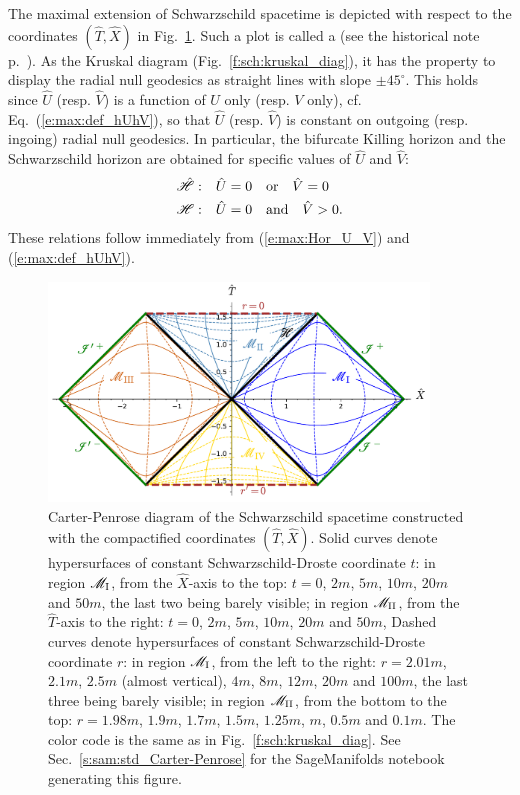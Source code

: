 The maximal extension of Schwarzschild spacetime is depicted with respect
to the coordinates $(\hat{T},\hat{X})$ in Fig.~\ref{f:max:carter-penrose-std}.
Such a plot is called a 
(see the historical note p.~\pageref{h:max:CP-diag}).
As the Kruskal diagram (Fig.~\ref{f:sch:kruskal_diag}), it has the property
to display the radial null geodesics as straight lines with slope $\pm 45^\circ$.
This holds
since $\hat{U}$ (resp. $\hat{V}$) is a function of $U$ only
(resp. $V$ only), cf. Eq.~(\ref{e:max:def_hUhV}), so that $\hat{U}$
(resp. $\hat{V}$) is constant on outgoing (resp. ingoing) radial null geodesics.
In particular, the bifurcate Killing horizon and the Schwarzschild horizon
are obtained for specific values of $\hat{U}$ and $\hat{V}$:
\begin{subequations}
\begin{align}
    \hat{\mathscr{H}}:\quad&  \hat{U} = 0 \quad\mbox{or}\quad \hat{V} = 0 \\
    \mathscr{H}:\quad &  \hat{U} = 0 \quad\mbox{and}\quad \hat{V} > 0 .
\end{align}
\end{subequations}
These relations follow immediately from (\ref{e:max:Hor_U_V}) and
(\ref{e:max:def_hUhV}).


\begin{figure}
\centerline{\includegraphics[width=0.9\textwidth]{max_carter-penrose-std.pdf}}
\caption[]{\label{f:max:carter-penrose-std} \footnotesize
Carter-Penrose diagram of the Schwarzschild spacetime
constructed with the compactified coordinates $(\hat{T},\hat{X})$.
Solid curves denote hypersurfaces of constant Schwarzschild-Droste coordinate
$t$: in region $\mathscr{M}_{\rm I}$, from the $\hat{X}$-axis to the top: $t=0$, $2m$,
$5m$, $10m$, $20m$ and $50m$, the last two being barely visible;
in region $\mathscr{M}_{\rm II}$, from the $\hat{T}$-axis
to the right: $t=0$, $2m$, $5m$, $10m$, $20m$ and $50m$,
Dashed curves denote hypersurfaces of constant Schwarzschild-Droste coordinate
$r$: in region $\mathscr{M}_{\rm I}$, from the left to the right: $r=2.01m$, $2.1m$, $2.5m$ (almost vertical), $4m$, $8m$, $12m$, $20m$ and $100m$, the last three being barely visible;
in region $\mathscr{M}_{\rm II}$, from the bottom to the top: $r=1.98m$, $1.9m$, $1.7m$,
$1.5m$, $1.25m$, $m$, $0.5m$ and $0.1m$.
The color code
is the same as in Fig.~\ref{f:sch:kruskal_diag}.
See Sec.~\ref{s:sam:std_Carter-Penrose} for the
SageManifolds notebook generating this figure.}
\end{figure}


